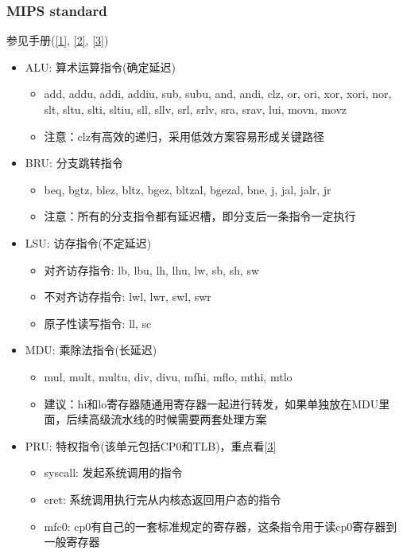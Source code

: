 \documentclass[lang=cn,11pt,a4paper]{elegantpaper}
\begin{document}
\subsubsection{MIPS standard}
参见手册(\href{run:../manuals/MIPS_Vol1.pdf}{[1]}, \href{run:../manuals/MIPS_Vol2.pdf}{[2]}, \href{run:../manuals/MIPS_Vol3.pdf}{[3]})
\begin{itemize}
\item ALU: 算术运算指令(确定延迟)
  \begin{itemize}
  \item add, addu, addi, addiu, sub, subu, and, andi, clz, or, ori, xor, xori, nor, slt, sltu, slti, sltiu, sll, sllv, srl, srlv, sra, srav, lui, movn, movz
  \item 注意：clz有高效的递归，采用低效方案容易形成关键路径
  \end{itemize}
\item BRU: 分支跳转指令
  \begin{itemize}
  \item beq, bgtz, blez, bltz, bgez, bltzal, bgezal, bne, j, jal, jalr, jr
  \item 注意：所有的分支指令都有延迟槽，即分支后一条指令一定执行
  \end{itemize}
\item LSU: 访存指令(不定延迟)
  \begin{itemize}
  \item 对齐访存指令: lb, lbu, lh, lhu, lw, sb, sh, sw
  \item 不对齐访存指令: lwl, lwr, swl, swr
  \item 原子性读写指令: ll, sc
  \end{itemize}
\item MDU: 乘除法指令(长延迟)
  \begin{itemize}
  \item mul, mult, multu, div, divu, mfhi, mflo, mthi, mtlo
  \item 建议：hi和lo寄存器随通用寄存器一起进行转发，如果单独放在MDU里面，后续高级流水线的时候需要两套处理方案
  \end{itemize}
\item PRU: 特权指令(该单元包括CP0和TLB)，重点看\href{run:../manuals/MIPS_Vol3.pdf}{[3]}
  \begin{itemize}
  \item syscall: 发起系统调用的指令
  \item eret: 系统调用执行完从内核态返回用户态的指令
  \item mfc0: cp0有自己的一套标准规定的寄存器，这条指令用于读cp0寄存器到一般寄存器

\end{itemize}
\end{itemize}
\end{document}
